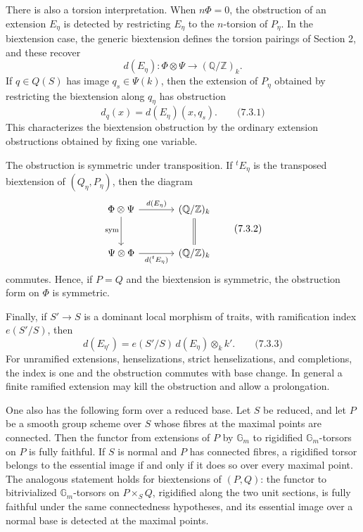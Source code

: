 \documentclass[11pt]{article}
\providecommand{\Z}{\mathbb Z}
\providecommand{\Q}{\mathbb Q}
\providecommand{\Gm}{\mathbb G_m}
\providecommand{\Gm}{\mathbb G_m}
\providecommand{\Z}{\mathbb Z}
\providecommand{\Q}{\mathbb Q}
\begin{document}
There is also a torsion interpretation.  When \(n\Phi=0\), the obstruction of an extension \(E_\eta\) is detected by restricting \(E_\eta\) to the \(n\)-torsion of \(P_\eta\).  In the biextension case, the generic biextension defines the torsion pairings of Section 2, and these recover
\[
        d(E_\eta):\Phi\otimes\Psi\to(\Q/\Z)_k.
\]
If \(q\in Q(S)\) has image \(q_s\in \Psi(k)\), then the extension of \(P_\eta\) obtained by restricting the biextension along \(q_\eta\) has obstruction
\[
        d_q(x)=d(E_\eta)(x,q_s).
\qquad\text{(7.3.1)}
\]
This characterizes the biextension obstruction by the ordinary extension obstructions obtained by fixing one variable.

The obstruction is symmetric under transposition.  If \({}^tE_\eta\) is the transposed biextension of \((Q_\eta,P_\eta)\), then the diagram
\[
\begin{tikzcd}[column sep=large,row sep=large]
 \Phi\otimes\Psi \arrow[r,"d(E_\eta)"]\arrow[d,"\mathrm{sym}"'] & (\Q/\Z)_k\arrow[d,equal]\\
 \Psi\otimes\Phi \arrow[r,"d({}^tE_\eta)"'] & (\Q/\Z)_k
\end{tikzcd}
\qquad\text{(7.3.2)}
\]
commutes.  Hence, if \(P=Q\) and the biextension is symmetric, the obstruction form on \(\Phi\) is symmetric.

Finally, if \(S'\to S\) is a dominant local morphism of traits, with ramification index \(e(S'/S)\), then
\[
        d(E_{\eta'})=e(S'/S)\, d(E_\eta)\otimes_k k'.
\qquad\text{(7.3.3)}
\]
For unramified extensions, henselizations, strict henselizations, and completions, the index is one and the obstruction commutes with base change.  In general a finite ramified extension may kill the obstruction and allow a prolongation.

One also has the following form over a reduced base.  Let \(S\) be reduced, and let \(P\) be a smooth group scheme over \(S\) whose fibres at the maximal points are connected.  Then the functor from extensions of \(P\) by \(\Gm\) to rigidified \(\Gm\)-torsors on \(P\) is fully faithful.  If \(S\) is normal and \(P\) has connected fibres, a rigidified torsor belongs to the essential image if and only if it does so over every maximal point.  The analogous statement holds for biextensions of \((P,Q)\): the functor to bitrivialized \(\Gm\)-torsors on \(P\times_SQ\), rigidified along the two unit sections, is fully faithful under the same connectedness hypotheses, and its essential image over a normal base is detected at the maximal points.
\end{document}
